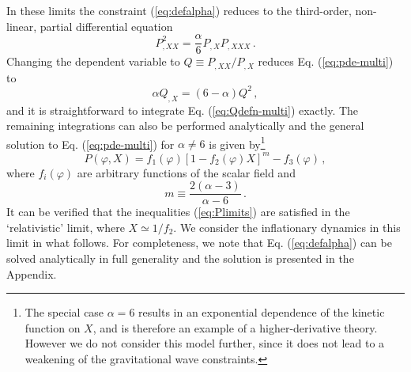 In these limits the constraint (\ref{eq:defalpha}) reduces to the 
third-order, non-linear, partial differential equation
% 
\begin{equation}
\label{eq:pde-multi}
P^2_{,XX} = \frac{\alpha}{6} P_{,X} P_{,XXX} \,.
\end{equation}
% 
Changing the dependent variable to $Q \equiv P_{,XX}/P_{,X}$ 
reduces Eq. (\ref{eq:pde-multi}) to
%  
\begin{equation}
\label{eq:Qdefn-multi}
\alpha Q_{,X} = (6-\alpha )Q^2 \,,
\end{equation}
% 
and it is straightforward to integrate Eq. (\ref{eq:Qdefn-multi}) 
exactly. The remaining integrations can also be performed analytically 
and the general solution to Eq. (\ref{eq:pde-multi}) for $\alpha \ne
6$ is given by\footnote{The special case $\alpha =6$ results in an 
exponential dependence of the kinetic function on $X$, and is 
therefore an example of a higher-derivative theory. However we 
do not consider this model further, since it does not lead to a 
weakening of the gravitational wave constraints.}
% 
\begin{equation}
\label{eq:gensoln-multi}
P (\varphi , X) = f_1 (\varphi ) \left[ 1-f_2 (\varphi ) X 
\right]^m -f_3(\varphi ) \,,
\end{equation}
% 
where $f_i (\varphi )$ are arbitrary functions of the scalar 
field and
%  
\begin{equation}
m \equiv \frac{2(\alpha -3 )}{\alpha -6} \, . 
\end{equation}
% 
It can be verified that the inequalities (\ref{eq:Plimits}) 
are satisfied in the `relativistic' limit, where $X \simeq 1/f_2$.
We consider the inflationary dynamics in this limit in what follows. 
For completeness, we note that Eq. (\ref{eq:defalpha}) can be solved 
analytically in 
full generality and the solution is presented in the Appendix. 


